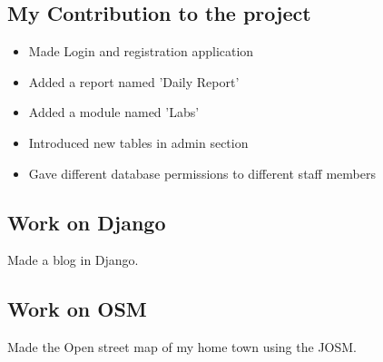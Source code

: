 \subsection{My Contribution to the project}
\begin{itemize}
\item Made Login and registration application
\item Added a report named 'Daily Report'
\item Added a module named 'Labs'
\item Introduced new tables in admin section
\item Gave different database permissions to different staff members
\end{itemize}

\subsection{Work on Django}
Made a blog in Django.

\subsection{Work on OSM}
Made the Open street map of my home town using the JOSM.
